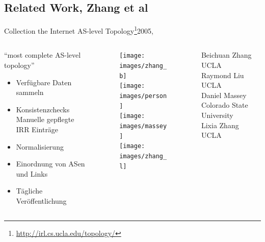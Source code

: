 \documentclass[ngerman,compress,hyperref={bookmarks}]{beamer}
\begin{document}
\subsection{Related Work, Zhang et al}
\begin{frame}{Collection the Internet AS-level Topology\footnote{\url{http://irl.cs.ucla.edu/topology/}}}{2005, \cite{Zhang:2005:CIA:1052812.1052825}}
  \begin{columns}[c]
    \begin{column}{0.5\textwidth}
      ``most complete AS-level topology''
      \begin{itemize}
        \item Verfügbare Daten sammeln
        \item Konsistenzchecks\\{\scriptsize Manuelle gepflegte IRR Einträge}
        \item Normalisierung
        \item Einordnung von ASen und Links
        \item Tägliche Veröffentlichung
      \end{itemize}
      \vspace{1cm}
    \end{column}
    \begin{column}{0.08\textwidth}
      \begin{figure}
        \label{zhang_et_al}
        \texttt{[image: images/zhang\_b]}\\
        \texttt{[image: images/person]}\\
        \texttt{[image: images/massey]}\\
        \texttt{[image: images/zhang\_l]}
      \end{figure}
    \end{column}
    \begin{column}{0.3\textwidth}
      {\scriptsize Beichuan Zhang\\
      \vspace{0.1cm}
      UCLA\\
      \vspace{0.7cm}
      Raymond Liu\\
      \vspace{0.1cm}
      UCLA\\
      \vspace{0.3cm}
      Daniel Massey\\
      \vspace{0.1cm}
      Colorado State University\\
      \vspace{0.3cm}
      Lixia Zhang\\
      \vspace{0.1cm}
      UCLA\\ }
    \end{column}
  \end{columns}
\end{frame}
\end{document}
